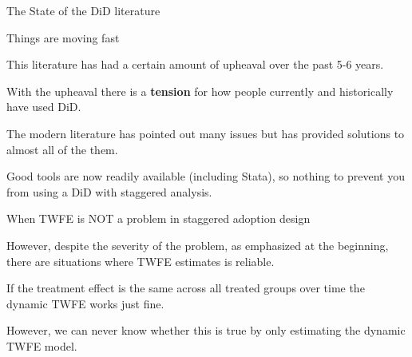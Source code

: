 \documentclass[notes,11pt, aspectratio=169]{beamer}
\newenvironment{wideitemize}{\itemize\addtolength{\itemsep}{10pt}}{\enditemize}
\begin{document}
\begin{frame}{The State of the DiD literature}
      \begin{wideitemize}
      \item Things are moving fast 

      \item This literature has had a certain amount of upheaval over the past 5-6 years. 
        
      \item With the upheaval there is a \textbf{tension} for how people currently and historically have used DiD.

      \item The modern literature has pointed out many issues but has provided solutions to almost all of the them.
      
      \item Good tools are now readily available (including Stata), so nothing to prevent you from using a DiD with staggered analysis.
      \end{wideitemize}
\end{frame}

\begin{frame}{When TWFE is NOT a problem in staggered adoption design}
      \begin{wideitemize}
         \item However, despite the severity of the problem, as emphasized at the beginning, there are situations where TWFE estimates is reliable.
      
         \item If the treatment effect is the same across all treated groups over time the dynamic TWFE works just fine. 

         \item However, we can never know whether this is true by only estimating the dynamic TWFE model.
        \end{wideitemize}
\end{frame}
\end{document}

